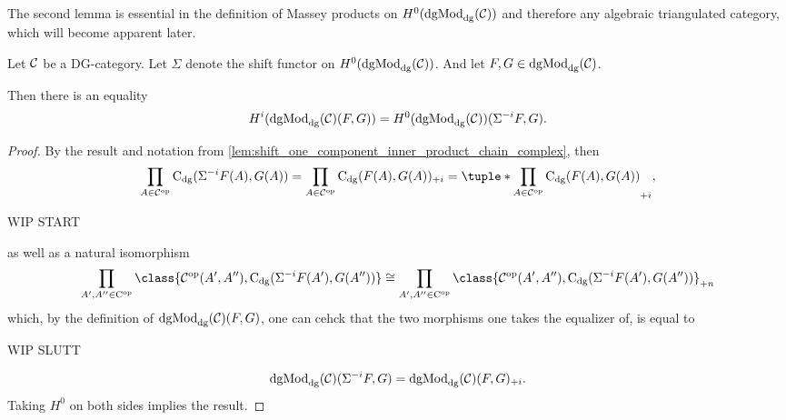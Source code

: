 
The second lemma is essential in the definition of Massey products on \( H^0(\operatorname{dgMod}_{\operatorname{dg}}({\mathcal{C}})) \) and therefore any algebraic triangulated category, which will become apparent later.

\begin{lemma}
    \label{lem:H^i_dgmod_cong_H^0_with_shift}
    Let \( {\mathcal{C}} \) be a DG-category. Let \( \Sigma \) denote the shift functor on \( H^0(\operatorname{dgMod}_{\operatorname{dg}}({\mathcal{C}})) \). And let \( F, G \in \operatorname{dgMod}_{\operatorname{dg}}({\mathcal{C}}) \).

    Then there is an equality
    \[
        H^i(\operatorname{dgMod}_{\operatorname{dg}}({\mathcal{C}})(F, G)) = H^0(\operatorname{dgMod}_{\operatorname{dg}}({\mathcal{C}}))(\Sigma^{-i} F, G).
    \]
\end{lemma}
\begin{proof}
    By the result and notation from \autoref{lem:shift_one_component_inner_product_chain_complex}, then
    \[
        \prod_{A \in \Cc^{\op}} \C_{\dg}(\Sigma^{-i} F(A), G(A)) = \prod_{A \in \Cc^{\op}} \C_{\dg}(F(A), G(A))_{+i} = \tuple*{\prod_{A \in \Cc^{\op}} \C_{\dg}(F(A), G(A))}_{+i},
    \]

    WIP START

    as well as a natural isomorphism
    \[
        \prod_{A', A'' \in \C^{\op}}\class{\Cc^{\op}(A', A''), \C_{\dg}(\Sigma^{-i}F(A'), G(A''))} \cong \prod_{A', A'' \in \C^{\op}}\class{\Cc^{\op}(A', A''), \C_{\dg}(\Sigma^{-i}F(A'), G(A''))}_{+n}
    \]
    which, by the definition of \( \operatorname{dgMod}_{\operatorname{dg}}({\mathcal{C}})(F, G) \), one can cehck that the two morphisms one takes the equalizer of, is equal to

    WIP SLUTT

    \[
        \operatorname{dgMod}_{\operatorname{dg}}({\mathcal{C}})(\Sigma^{-i} F, G) = \operatorname{dgMod}_{\operatorname{dg}}({\mathcal{C}})(F, G)_{+i}.
    \]
    Taking \( H^0 \) on both sides implies the result.
\end{proof}

